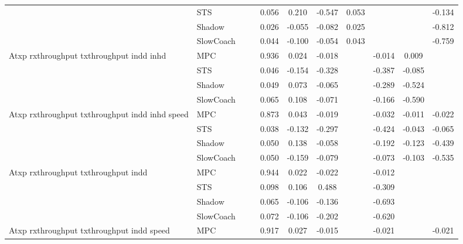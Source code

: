\begin{tabular}{|l|l|*{9}{c|}}
                              & STS &       &        &     0.056 &  0.210 & -0.547 &  0.053 &      &      &   -0.134 \\
                              & Shadow &       &        &     0.026 & -0.055 & -0.082 &  0.025 &      &      &   -0.812 \\
                              & SlowCoach &       &        &     0.044 & -0.100 & -0.054 &  0.043 &      &      &   -0.759 \\
\midrule
Atxp rxthroughput txthroughput indd inhd    & MPC &       &        &     0.936 &  0.024 & -0.018 &     &  -0.014 &   0.009 &       \\
                              & STS &       &        &     0.046 & -0.154 & -0.328 &     &  -0.387 &  -0.085 &       \\
                              & Shadow &       &        &     0.049 &  0.073 & -0.065 &     &  -0.289 &  -0.524 &       \\
                              & SlowCoach &       &        &     0.065 &  0.108 & -0.071 &     &  -0.166 &  -0.590 &       \\
\midrule
Atxp rxthroughput txthroughput indd inhd speed    & MPC &       &        &     0.873 &  0.043 & -0.019 &     &  -0.032 &  -0.011 &   -0.022 \\
                              & STS &       &        &     0.038 & -0.132 & -0.297 &     &  -0.424 &  -0.043 &   -0.065 \\
                              & Shadow &       &        &     0.050 &  0.138 & -0.058 &     &  -0.192 &  -0.123 &   -0.439 \\
                              & SlowCoach &       &        &     0.050 & -0.159 & -0.079 &     &  -0.073 &  -0.103 &   -0.535 \\
\midrule
Atxp rxthroughput txthroughput indd    & MPC &       &        &     0.944 &  0.022 & -0.022 &     &  -0.012 &      &       \\
                              & STS &       &        &     0.098 &  0.106 &  0.488 &     &  -0.309 &      &       \\
                              & Shadow &       &        &     0.065 & -0.106 & -0.136 &     &  -0.693 &      &       \\
                              & SlowCoach &       &        &     0.072 & -0.106 & -0.202 &     &  -0.620 &      &       \\
\midrule
Atxp rxthroughput txthroughput indd speed    & MPC &       &        &     0.917 &  0.027 & -0.015 &     &  -0.021 &      &   -0.021 \\

\end{tabular}
